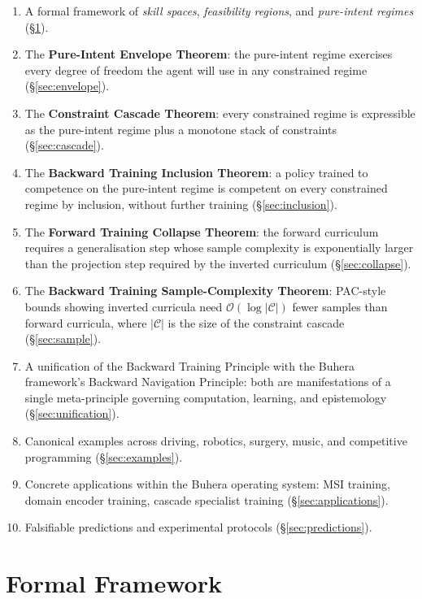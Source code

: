 \documentclass[11pt,twocolumn,a4paper]{article}
\newcommand{\cC}{\mathcal{C}}
\begin{document}
\begin{enumerate}[leftmargin=*,itemsep=2pt]
\item A formal framework of \emph{skill spaces}, \emph{feasibility regions}, and \emph{pure-intent regimes} (\S\ref{sec:framework}).
\item The \textbf{Pure-Intent Envelope Theorem}: the pure-intent regime exercises every degree of freedom the agent will use in any constrained regime (\S\ref{sec:envelope}).
\item The \textbf{Constraint Cascade Theorem}: every constrained regime is expressible as the pure-intent regime plus a monotone stack of constraints (\S\ref{sec:cascade}).
\item The \textbf{Backward Training Inclusion Theorem}: a policy trained to competence on the pure-intent regime is competent on every constrained regime by inclusion, without further training (\S\ref{sec:inclusion}).
\item The \textbf{Forward Training Collapse Theorem}: the forward curriculum requires a generalisation step whose sample complexity is exponentially larger than the projection step required by the inverted curriculum (\S\ref{sec:collapse}).
\item The \textbf{Backward Training Sample-Complexity Theorem}: PAC-style bounds showing inverted curricula need $\mathcal{O}(\log|\cC|)$ fewer samples than forward curricula, where $|\cC|$ is the size of the constraint cascade (\S\ref{sec:sample}).
\item A unification of the Backward Training Principle with the Buhera framework's Backward Navigation Principle: both are manifestations of a single meta-principle governing computation, learning, and epistemology (\S\ref{sec:unification}).
\item Canonical examples across driving, robotics, surgery, music, and competitive programming (\S\ref{sec:examples}).
\item Concrete applications within the Buhera operating system: MSI training, domain encoder training, cascade specialist training (\S\ref{sec:applications}).
\item Falsifiable predictions and experimental protocols (\S\ref{sec:predictions}).
\end{enumerate}


\section{Formal Framework}
\label{sec:framework}
\end{document}
